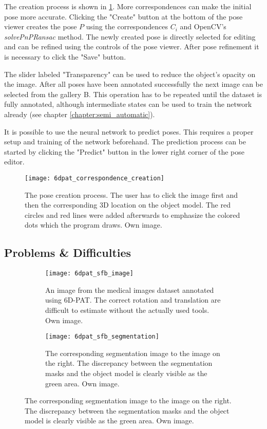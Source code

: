 The creation process is shown in \fig \ref{fig:6dpat_correspondence_creation}. More correspondences can make the initial pose more accurate. Clicking the "Create" button at the bottom of the pose viewer creates the pose $P$ using the correspondences $C_i$ and OpenCV's \textit{solvePnPRansac} method. The newly created pose is directly selected for editing and can be refined using the controls of the pose viewer. After pose refinement it is necessary to click the "Save" button. 

The slider labeled "Transparency" can be used to reduce the object's opacity on the image. After all poses have been annotated successfully the next image can be selected from the gallery B. This operation has to be repeated until the dataset is fully annotated, although intermediate states can be used to train the network already (see chapter \ref{chapter:semi_automatic}).

It is possible to use the neural network to predict poses. This requires a proper setup and training of the network beforehand. The prediction process can be started by clicking the "Predict" button in the lower right corner of the pose editor.

\begin{figure}[!tbp]
	\centering
    \texttt{[image: 6dpat\_correspondence\_creation]}
    \caption{The pose creation process. The user has to click the image first and then the corresponding 3D location on the object model. The red circles and red lines were added afterwards to emphasize the colored dots which the program draws. Own image.}
    \label{fig:6dpat_correspondence_creation}
\end{figure} 

\subsection{Problems \& Difficulties} \label{section:6dpat_difficulties}

\begin{figure}[!tbp]
	\begin{subfigure}[t]{0.47\textwidth}
		\centering
    	\texttt{[image: 6dpat\_sfb\_image]}
    	\caption{An image from the medical images dataset annotated using 6D-PAT. The correct rotation and translation are difficult to estimate without the actually used tools. Own image.}
    	\label{fig:6dpat_sfb_image}
	\end{subfigure} 
	\hfill
	\begin{subfigure}[t]{0.47\textwidth}
		\centering
    	\texttt{[image: 6dpat\_sfb\_segmentation]}
    	\caption{The corresponding segmentation image to the image on the right. The discrepancy between the segmentation masks and the object model is clearly visible as the green area. Own image.}
    	\label{fig:6dpat_sfb_segmentation}
	\end{subfigure} 
\end{figure} 

